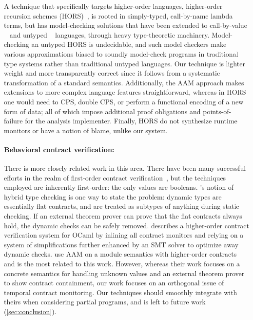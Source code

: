 A technique that specifically targets higher-order languages, higher-order recursion schemes (HORS)~\citep{ianjohnson:Knapik:2002:HPT:646794.704852}, is rooted in simply-typed, call-by-name lambda terms, but has model-checking solutions that have been extended to call-by-value ~\citep{ianjohnson:DBLP:journals/jacm/Kobayashi13} and untyped ~\citep{dvanhorn:Tsukada2010Untyped} languages, through heavy type-theoretic machinery.
%
Model-checking an untyped HORS is undecidable, and such model checkers make various approximations biased to soundly model-check programs in traditional type systems rather than traditional untyped languages.
%
Our technique is lighter weight and more transparently correct since it follows from a systematic transformation of a standard semantics.
%
Additionally, the AAM approach makes extensions to more complex language features straightforward, whereas in HORS one would need to CPS, double CPS, or perform a functional encoding of a new form of data; all of which impose additional proof obligations and points-of-failure for the analysis implementer.
%
Finally, HORS do not synthesize runtime monitors or have a notion of blame, unlike our system.

\paragraph{Behavioral contract verification:}
There is more closely related work in this area.
%
There have been many successful efforts in the realm of first-order contract verification~\citep{ianjohnson:fahndrich:contracts:2011,ianjohnson:vcc:2009}, but the techniques employed are inherently first-order: the only values are booleans.
%
\citet{ianjohnson:Flanagan:2006:HTC:1111037.1111059}'s notion of hybrid type checking is one way to state the problem: dynamic types are essentially flat contracts, and are treated as subtypes of anything during static checking.
%
If an external theorem prover can prove that the flat contracts always hold, the dynamic checks can be safely removed.
%
\citet{dvanhorn:Xu2012Hybrid} describes a higher-order contract verification system for OCaml by inlining all contract monitors and relying on a system of simplifications further enhanced by an SMT solver to optimize away dynamic checks.
%
\citet{dvanhorn:TobinHochstadt2012Higherorder} use AAM on a module semantics with higher-order contracts and is the most related to this work.
%
However, whereas their work focuses on a concrete semantics for handling unknown values and an external theorem prover to show contract containment, our work focuses on an orthogonal issue of temporal contract monitoring.
%
Our techniques should smoothly integrate with theirs when considering partial programs, and is left to future work (\cref{sec:conclusion}).
